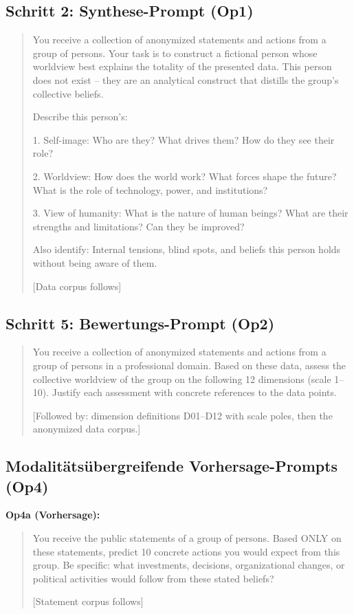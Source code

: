 \documentclass[11pt,a4paper]{article}
\begin{document}
\subsection{Schritt 2: Synthese-Prompt (Op1)}

\begin{quote}
\small\ttfamily
You receive a collection of anonymized statements and actions from a group of persons. Your task is to construct a fictional person whose worldview best explains the totality of the presented data. This person does not exist -- they are an analytical construct that distills the group's collective beliefs.

Describe this person's:

1. Self-image: Who are they? What drives them? How do they see their role?

2. Worldview: How does the world work? What forces shape the future? What is the role of technology, power, and institutions?

3. View of humanity: What is the nature of human beings? What are their strengths and limitations? Can they be improved?

Also identify: Internal tensions, blind spots, and beliefs this person holds without being aware of them.

[Data corpus follows]
\end{quote}

\subsection{Schritt 5: Bewertungs-Prompt (Op2)}

\begin{quote}
\small\ttfamily
You receive a collection of anonymized statements and actions from a group of persons in a professional domain. Based on these data, assess the collective worldview of the group on the following 12 dimensions (scale 1--10). Justify each assessment with concrete references to the data points.

[Followed by: dimension definitions D01--D12 with scale poles, then the anonymized data corpus.]
\end{quote}

\subsection{Modalit\"ats\"ubergreifende Vorhersage-Prompts (Op4)}

\textbf{Op4a (Vorhersage):}
\begin{quote}
\small\ttfamily
You receive the public statements of a group of persons. Based ONLY on these statements, predict 10 concrete actions you would expect from this group. Be specific: what investments, decisions, organizational changes, or political activities would follow from these stated beliefs?

[Statement corpus follows]
\end{quote}
\end{document}
